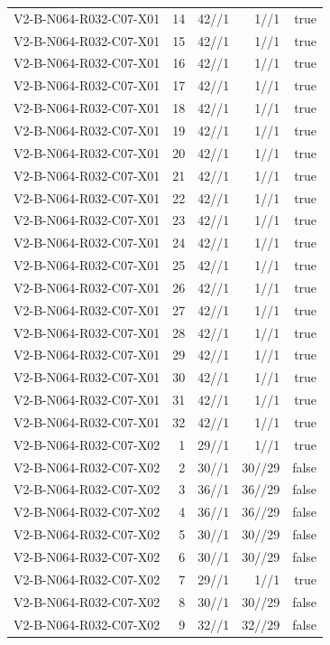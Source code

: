 {\begin{longtable}{lrrrr}
V2-B-N064-R032-C07-X01 & 14 & 42//1 & 1//1 & true \\
V2-B-N064-R032-C07-X01 & 15 & 42//1 & 1//1 & true \\
V2-B-N064-R032-C07-X01 & 16 & 42//1 & 1//1 & true \\
V2-B-N064-R032-C07-X01 & 17 & 42//1 & 1//1 & true \\
V2-B-N064-R032-C07-X01 & 18 & 42//1 & 1//1 & true \\
V2-B-N064-R032-C07-X01 & 19 & 42//1 & 1//1 & true \\
V2-B-N064-R032-C07-X01 & 20 & 42//1 & 1//1 & true \\
V2-B-N064-R032-C07-X01 & 21 & 42//1 & 1//1 & true \\
V2-B-N064-R032-C07-X01 & 22 & 42//1 & 1//1 & true \\
V2-B-N064-R032-C07-X01 & 23 & 42//1 & 1//1 & true \\
V2-B-N064-R032-C07-X01 & 24 & 42//1 & 1//1 & true \\
V2-B-N064-R032-C07-X01 & 25 & 42//1 & 1//1 & true \\
V2-B-N064-R032-C07-X01 & 26 & 42//1 & 1//1 & true \\
V2-B-N064-R032-C07-X01 & 27 & 42//1 & 1//1 & true \\
V2-B-N064-R032-C07-X01 & 28 & 42//1 & 1//1 & true \\
V2-B-N064-R032-C07-X01 & 29 & 42//1 & 1//1 & true \\
V2-B-N064-R032-C07-X01 & 30 & 42//1 & 1//1 & true \\
V2-B-N064-R032-C07-X01 & 31 & 42//1 & 1//1 & true \\
V2-B-N064-R032-C07-X01 & 32 & 42//1 & 1//1 & true \\
V2-B-N064-R032-C07-X02 & 1 & 29//1 & 1//1 & true \\
V2-B-N064-R032-C07-X02 & 2 & 30//1 & 30//29 & false \\
V2-B-N064-R032-C07-X02 & 3 & 36//1 & 36//29 & false \\
V2-B-N064-R032-C07-X02 & 4 & 36//1 & 36//29 & false \\
V2-B-N064-R032-C07-X02 & 5 & 30//1 & 30//29 & false \\
V2-B-N064-R032-C07-X02 & 6 & 30//1 & 30//29 & false \\
V2-B-N064-R032-C07-X02 & 7 & 29//1 & 1//1 & true \\
V2-B-N064-R032-C07-X02 & 8 & 30//1 & 30//29 & false \\
V2-B-N064-R032-C07-X02 & 9 & 32//1 & 32//29 & false \\

\end{longtable}}
